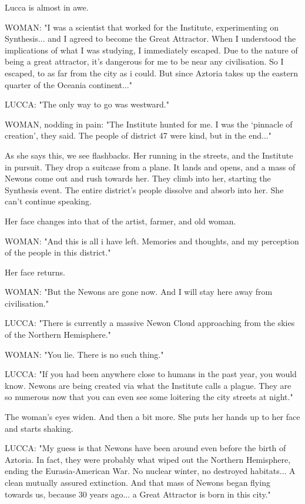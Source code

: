 \documentclass[11pt]{article}
\begin{document}
Lucca is almost in awe.

WOMAN: "I was a scientist that worked for the Institute, experimenting on Synthesis... and I agreed to become the Great Attractor.
When I understood the implications of what I was studying, I immediately escaped. 
Due to the nature of being a great attractor, it's dangerous for me to be near any civilisation.
So I escaped, to as far from the city as i could.
But since Aztoria takes up the eastern quarter of the Oceania continent..."

LUCCA: "The only way to go was westward."

WOMAN, nodding in pain: "The Institute hunted for me. 
I was the `pinnacle of creation', they said.
The people of district 47 were kind, but in the end..."

As she says this, we see flashbacks.
Her running in the streets, and the Institute in pursuit.
They drop a suitcase from a plane.
It lands and opens, and a mass of Newons come out and rush towards her.
They climb into her, starting the Synthesis event.
The entire district's people dissolve and absorb into her.
She can't continue speaking.

Her face changes into that of the artist, farmer, and old woman.

WOMAN: "And this is all i have left.
Memories and thoughts, and my perception of the people in this district."

Her face returns.

WOMAN: "But the Newons are gone now. 
And I will stay here away from civilisation."

LUCCA: "There is currently a massive Newon Cloud approaching from the skies of the Northern Hemisphere."

WOMAN: "You lie. There is no such thing."

LUCCA: "If you had been anywhere close to humans in the past year, you would know.
Newons are being created via what the Institute calls a plague.
They are so numerous now that you can even see some loitering the city streets at night."

The woman’s eyes widen. And then a bit more. She puts her hands up to her face and starts shaking. 

LUCCA: "My guess is that Newons have been around even before the birth of Aztoria.
In fact, they were probably what wiped out the Northern Hemisphere, ending the Eurasia-American War.
No nuclear winter, no destroyed habitats... A clean mutually assured extinction.
And that mass of Newons began flying towards us, because 30 years ago... a Great Attractor is born in this city."
\end{document}
